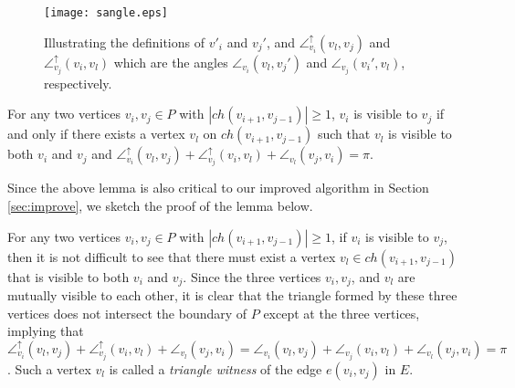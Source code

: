 \documentclass[11pt]{article}
\def\sangle{\angle^{\uparrow}}
\def\lemmaspace{\vspace*{0in}}
\begin{document}
\begin{figure}[t]
\begin{minipage}[t]{\linewidth}
\begin{center}
\texttt{[image: sangle.eps]}
\caption{\footnotesize Illustrating the definitions of $v'_i$ and
$v_j'$, and $\sangle_{v_i}(v_l,v_j)$ and
$\sangle_{v_j}(v_i,v_l)$ which are the angles $\angle_{v_i}(v_l,v_j')$ and
$\angle_{v_j}(v_i',v_l)$, respectively. 
}\label{fig:sangle}
\end{center}
\end{minipage}
\end{figure}

\lemmaspace
\begin{lemma}\label{lem:10}\cite{ref:DisserRe10}
For any two vertices $v_i,v_j\in P$ with $|ch(v_{i+1},v_{j-1})|\geq 1$, 
$v_i$ is visible
to $v_j$ if and only if there exists a vertex $v_l$ on
$ch(v_{i+1},v_{j-1})$ such that $v_l$ is visible to both $v_i$ and
$v_j$ and
$\sangle_{v_i}(v_l,v_j)+\sangle_{v_j}(v_i,v_l)+\angle_{v_l}(v_j,v_i)=\pi$. 
\end{lemma}
\lemmaspace

Since the above lemma is also critical to our improved algorithm in 
Section \ref{sec:improve}, we sketch the proof of the lemma below. 

For any two
vertices $v_i,v_j\in P$ with $|ch(v_{i+1},v_{j-1})|\geq 1$, if $v_i$ is visible to
$v_j$, then it is not difficult to see that 
there must exist a vertex $v_l\in ch(v_{i+1},v_{j-1})$ that is 
visible to both $v_i$ and $v_j$. Since the three vertices
$v_i,v_j$, and $v_l$ are mutually visible to each other, it is clear
that the triangle formed by these three vertices does not intersect the
boundary of $P$ except at the three vertices, implying 
that $\sangle_{v_i}(v_l,v_j)+\sangle_{v_j}(v_i,v_l)+\angle_{v_l}(v_j,v_i)=
\angle_{v_i}(v_l,v_j)+\angle_{v_j}(v_i,v_l)+\angle_{v_l}(v_j,v_i)=\pi$. 
Such a vertex $v_l$ is called a {\em triangle witness} of the edge
$e(v_i,v_j)$ in $E$. 
\end{document}
